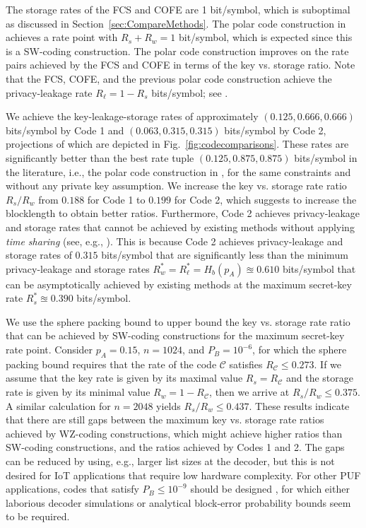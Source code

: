 \documentclass[journal,10pt,twoside]{IEEEtran}
\begin{document}
The storage rates of the FCS and COFE are 1 bit/symbol, which is suboptimal as discussed in Section~\ref{sec:CompareMethods}. The polar code construction in \cite{IgnaPolar} achieves a rate point with $R_s+R_w =1$ bit/symbol, which is expected since this is a SW-coding construction. The polar code construction improves on the rate pairs achieved by the FCS and COFE in terms of the key vs. storage ratio. Note that the FCS, COFE, and the previous polar code construction achieve the privacy-leakage rate $R_\ell= 1-R_s$ bits/symbol; see \cite[Eq. (21)]{IgnaFuzzy}.
	
We achieve the key-leakage-storage rates of approximately $(0.125, 0.666, 0.666)$ bits/symbol by Code 1 and $(0.063, 0.315, 0.315)$ bits/symbol by Code 2, projections of which are depicted in Fig.~\ref{fig:codecomparisons}. These rates are significantly better than the best rate tuple $(0.125, 0.875, 0.875)$ bits/symbol in the literature, i.e., the polar code construction in \cite{IgnaPolar}, for the same constraints and without any private key assumption. We increase the key vs. storage rate ratio $R_s/R_w$ from $0.188$ for Code 1 to $0.199$ for Code 2, which suggests to increase the blocklength to obtain better ratios. Furthermore, Code 2 achieves privacy-leakage and storage rates that cannot be achieved by existing methods without applying \textit{time sharing} (see, e.g., \cite[Section 4.4]{Elgamalbook}). This is because Code 2 achieves privacy-leakage and storage rates of $0.315$ bits/symbol that are significantly less than the minimum privacy-leakage and storage rates $R^*_w=R^*_\ell=H_b(p_A)\approxeq0.610$ bits/symbol that can be asymptotically achieved by existing methods at the maximum secret-key rate $R_s^*\approxeq 0.390$ bits/symbol. 

We use the sphere packing bound \cite[Eq. (5.8.19)]{gallagerbook} to upper bound the key vs. storage rate ratio that can be achieved by SW-coding constructions for the maximum secret-key rate point. Consider $p_A=0.15$, $n=1024$, and $P_B=10^{-6}$, for which the sphere packing bound requires that the rate of the code $\mathcal{C}$ satisfies $R_\mathcal{C} \leq 0.273$. If we assume that the key rate is given by its maximal value $R_s = R_\mathcal{C}$ and the storage rate is given by its minimal value $R_w = 1 - R_\mathcal{C}$, then we arrive at $R_s/R_w \le 0.375$. A similar calculation for $n=2048$ yields $R_s/R_w \le 0.437$. These results indicate that there are still gaps between the maximum key vs. storage rate ratios achieved by WZ-coding constructions, which might achieve higher ratios than SW-coding constructions, and the ratios achieved by Codes 1 and 2. The gaps can be reduced by using, e.g., larger list sizes at the decoder, but this is not desired for IoT applications that require low hardware complexity. For other PUF applications, codes that satisfy $P_B\leq10^{-9}$ should be designed \cite{OurEntropy}, for which either laborious decoder simulations or analytical block-error probability bounds seem to be required.
 
\end{document}

